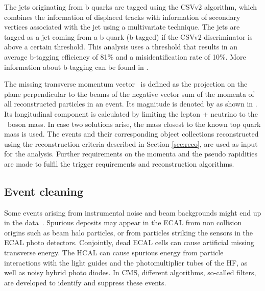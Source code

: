 The jets originating from b quarks are tagged using the CSVv2 algorithm, which combines the information of displaced tracks with information of secondary vertices associated with the jet using a multivariate technique. The jets are tagged as a jet coming from a b quark (b-tagged) if the CSVv2 discriminator is above a certain threshold.  This analysis uses a threshold that results in an average b-tagging efficiency of 81\% and a misidentification rate of 10\%. More information about b-tagging can be found in .

The missing transverse momentum vector \ptmisvec\ is defined as the projection on the plane perpendicular to the beams of the negative vector sum of the momenta of all reconstructed particles in an event. Its magnitude is denoted by \Etmis as shown in . Its longitudinal component is calculated by limiting the lepton + neutrino to the \PW\ boson mass. In case two solutions arise, the mass closest to the known top quark mass is used. 
The events and their corresponding object collections reconstructed using the reconstruction criteria described in Section \ref{sec:reco}, are used as input for the analysis. Further requirements on the momenta and the pseudo rapidities are made to fulfil the trigger requirements and reconstruction algorithms. %
\subsection{Event cleaning}
\label{sec:Filters}

Some events arising from instrumental noise and beam backgrounds might end up in the data~\cite{Filters,CMS-PAS-JME-16-004}. Spurious deposits may appear in the ECAL from non collision origins such as beam halo particles, or from particles striking the sensors in the ECAL photo detectors. Conjointly, dead ECAL cells can cause artificial missing transverse energy. The HCAL can cause spurious energy from particle interactions with the light guides and the photomultiplier tubes of the HF, as well as noisy hybrid photo diodes. In CMS, different algorithms, so-called filters, are developed to identify and suppress these events. 


